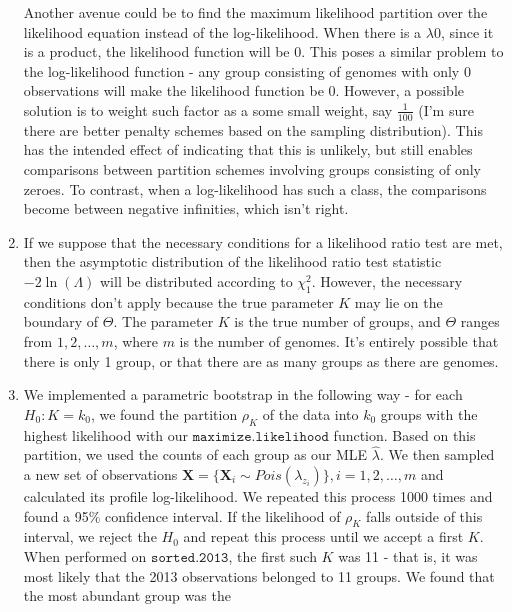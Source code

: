 \documentclass[10pt]{article}
\begin{document}
\begin{enumerate}[label = \textbf{\alph*.}]
        Another avenue could be to find the maximum likelihood partition over the likelihood equation instead of the log-likelihood.  When there is a $\lambda  0$, since it is a product, the likelihood function will be 0.  This poses a similar problem to the log-likelihood function - any group consisting of genomes with only 0 observations will make the likelihood function be 0.  However, a possible solution is to weight such factor as a some small weight, say $\frac{1}{100}$ (I'm sure there are better penalty schemes based on the sampling distribution).  This has the intended effect of indicating that this is unlikely, but still enables comparisons between partition schemes involving groups consisting of only zeroes.  To contrast, when a log-likelihood has such a class, the comparisons become between negative infinities, which isn't right.
        
        \item If we suppose that the necessary conditions for a likelihood ratio test are met, then the asymptotic distribution of the likelihood ratio test statistic $-2\ln(\Lambda)$ will be distributed according to $\chi^2_1$. However, the necessary conditions don't apply because the true parameter $K$ may lie on the boundary of $\Theta$.  The parameter $K$ is the true number of groups, and $\Theta$ ranges from $1, 2, \dots, m$, where $m$ is the number of genomes.  It's entirely possible that there is only 1 group, or that there are as many groups as there are genomes.  
        
        \item We implemented a parametric bootstrap in the following way - for each $H_0 : K = k_0$, we found the partition $\rho_K$ of the data into $k_0$ groups with the highest likelihood with our $\texttt{maximize.likelihood}$ function.  Based on this partition, we used the counts of each group as our MLE $\hat{\lambda}$.  We then sampled a new set of observations $\bm{X} = \{\bm{X}_i \sim Pois(\lambda_{z_i})\}, i = 1, 2, \dots, m$ and calculated its profile log-likelihood.  We repeated this process 1000 times and found a 95\% confidence interval.  If the likelihood of $\rho_K$ falls outside of this interval, we reject the $H_0$ and repeat this process until we accept a first $K$.  When performed on $\texttt{sorted.2013}$, the first such $K$ was 11 - that is, it was most likely that the 2013 observations belonged to 11 groups.  We found that the most abundant group was the 
    \end{enumerate}
    
\end{document}
